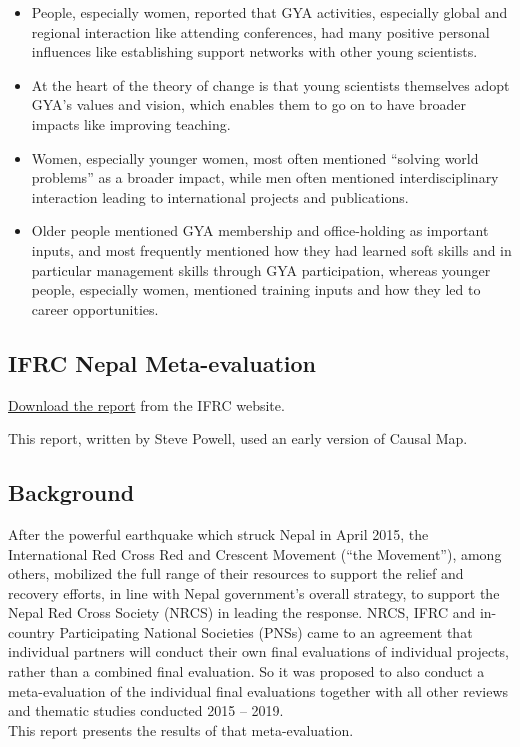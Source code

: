 \documentclass[
]{book}
\begin{document}
\begin{itemize}
\item
  People, especially women, reported that GYA activities, especially global and regional
  interaction like attending conferences, had many positive personal influences like
  establishing support networks with other young scientists.
\item
  At the heart of the theory of change is that young scientists themselves adopt GYA's
  values and vision, which enables them to go on to have broader impacts like improving
  teaching.
\item
  Women, especially younger women, most often mentioned ``solving world problems''
  as a broader impact, while men often mentioned interdisciplinary interaction leading
  to international projects and publications.
\item
  Older people mentioned GYA membership and office-holding as important inputs, and
  most frequently mentioned how they had learned soft skills and in particular
  management skills through GYA participation, whereas younger people, especially
  women, mentioned training inputs and how they led to career opportunities.
\end{itemize}

\hypertarget{ifrc-nepal-meta-evaluation}{%
\subsection{IFRC Nepal Meta-evaluation}\label{ifrc-nepal-meta-evaluation}}

\href{http://adore.ifrc.org/Download.aspx?FileId=313302}{Download the report} from the IFRC website.

This report, written by Steve Powell, used an early version of Causal Map.

\hypertarget{background}{%
\subsection{Background}\label{background}}

After the powerful earthquake which struck Nepal in April 2015, the International Red Cross Red and Crescent Movement (``the Movement''), among others, mobilized the full range of their resources to support the relief and recovery efforts, in line with Nepal government's overall strategy, to support the Nepal Red Cross Society (NRCS) in leading the response. NRCS, IFRC and in-country Participating National Societies (PNSs) came to an agreement that individual partners will conduct their own final evaluations of individual projects, rather than a combined final evaluation. So it was proposed to also conduct a meta-evaluation of the individual final evaluations together with all other reviews and thematic studies conducted 2015 -- 2019.\\
This report presents the results of that meta-evaluation.
\end{document}
